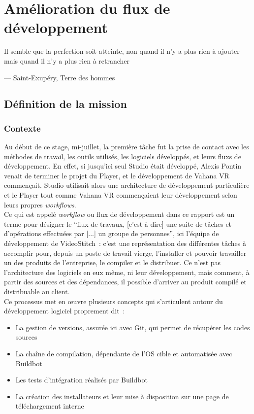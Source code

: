\chapter{Amélioration du flux de développement}
\epigraph{Il semble que la perfection soit atteinte, non quand il n'y a plus 
rien à ajouter mais quand il n'y a plus rien à retrancher}{--- \small{\textup{Saint-Exupéry,
Terre des hommes}}}

\section{Définition de la mission}
\subsection{Contexte}
Au début de ce stage, mi-juillet, la première tâche fut la prise de contact avec 
les méthodes de travail, les outils utilisés, les logiciels développés, et leurs
fluxs de développement. En effet, si jusqu'ici seul Studio était développé, Alexis
Pontin venait de terminer le projet du Player, et le développement de Vahana
VR commençait. Studio utilisait alors une architecture de développement particulière
et le Player tout comme Vahana VR commençaient leur développement selon leurs propres
\textit{workflows}.\\
\newline
Ce qui est appelé \textit{workflow} ou flux de développement dans ce rapport est un terme pour désigner le 
\enquote{flux de travaux, [c'est-à-dire] une suite de tâches et
d'opérations effectuées par [...] un groupe de personnes}\cite{workflow}, ici l'équipe de développement
de VideoStitch~: c'est une représentation des différentes tâches à accomplir pour, depuis un poste de travail vierge, 
l'installer et pouvoir travailler un des produits de l'entreprise, le compiler et le distribuer.
Ce n'est pas l'architecture des logiciels en eux même, ni leur développement,
mais comment, à partir des sources et des dépendances, il possible d'arriver au produit
compilé et distribuable au client.\\
Ce processus met en \oe uvre plusieurs concepts qui s'articulent autour du développement
logiciel proprement dit~:\cite{software-build}\cite{build-automation}
\begin{itemize}
  \item La gestion de versions, assurée ici avec Git\cite{gestion-versions}, qui permet
  de récupérer les codes sources
  \item La chaîne de compilation, dépendante de l'OS cible et automatisée avec Buildbot 
  \cite{chaine-compilation}\cite{integration-continue}
  \item Les tests d'intégration\cite{integration-continue} réalisés par Buildbot
  \item La création des installateurs et leur mise à disposition sur une page de téléchargement interne
\end{itemize}
